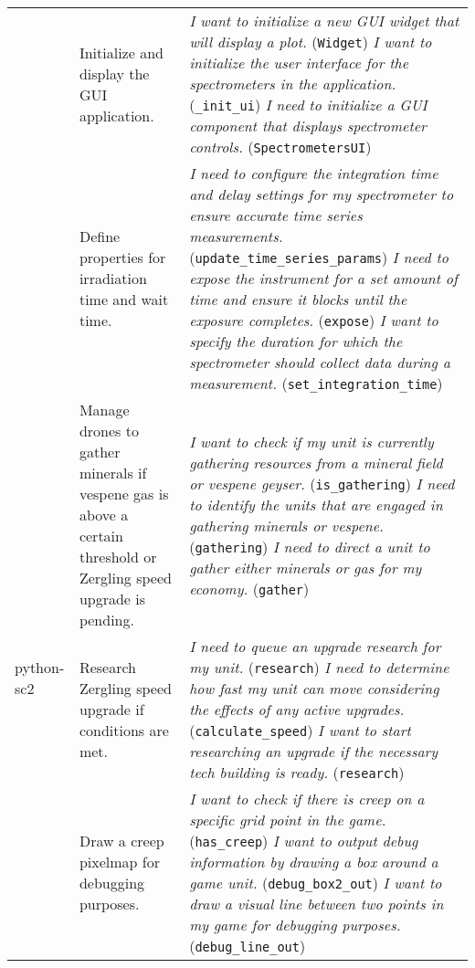 \begin{longtable}{p{3cm}p{6cm}p{6cm}}
\cmidrule(l){2-3}
& Initialize and display the GUI application. & \textit{I want to initialize a new GUI widget that will display a plot.} (\texttt{Widget}) \newline \textit{I want to initialize the user interface for the spectrometers in the application.} (\texttt{\_init\_ui}) \newline \textit{I need to initialize a GUI component that displays spectrometer controls.} (\texttt{SpectrometersUI}) \\
\cmidrule(l){2-3}
& Define properties for irradiation time and wait time. & \textit{I need to configure the integration time and delay settings for my spectrometer to ensure accurate time series measurements.} (\texttt{update\_time\_series\_params}) \newline \textit{I need to expose the instrument for a set amount of time and ensure it blocks until the exposure completes.} (\texttt{expose}) \newline \textit{I want to specify the duration for which the spectrometer should collect data during a measurement.} (\texttt{set\_integration\_time}) \\
\midrule
\multirow{3}{*}{python-sc2} & Manage drones to gather minerals if vespene gas is above a certain threshold or Zergling speed upgrade is pending. & \textit{I want to check if my unit is currently gathering resources from a mineral field or vespene geyser.} (\texttt{is\_gathering}) \newline \textit{I need to identify the units that are engaged in gathering minerals or vespene.} (\texttt{gathering}) \newline \textit{I need to direct a unit to gather either minerals or gas for my economy.} (\texttt{gather}) \\
\cmidrule(l){2-3}
& Research Zergling speed upgrade if conditions are met. & \textit{I need to queue an upgrade research for my unit.} (\texttt{research}) \newline \textit{I need to determine how fast my unit can move considering the effects of any active upgrades.} (\texttt{calculate\_speed}) \newline \textit{I want to start researching an upgrade if the necessary tech building is ready.} (\texttt{research}) \\
\cmidrule(l){2-3}
& Draw a creep pixelmap for debugging purposes. & \textit{I want to check if there is creep on a specific grid point in the game.} (\texttt{has\_creep}) \newline \textit{I want to output debug information by drawing a box around a game unit.} (\texttt{debug\_box2\_out}) \newline \textit{I want to draw a visual line between two points in my game for debugging purposes.} (\texttt{debug\_line\_out}) \\

\end{longtable}
